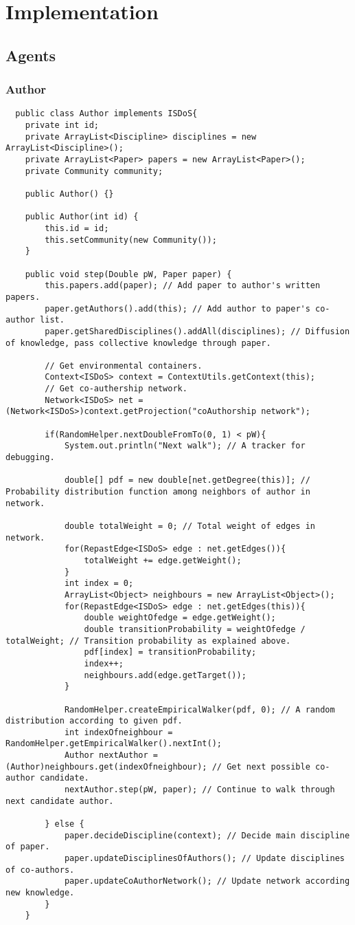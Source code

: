 \chapter{Implementation}
\section{Agents}

\subsection{Author}
\begin{lstlisting}
  public class Author implements ISDoS{
	private int id;
	private ArrayList<Discipline> disciplines = new ArrayList<Discipline>();
	private ArrayList<Paper> papers = new ArrayList<Paper>();
	private Community community;

	public Author() {}

	public Author(int id) {
		this.id = id;
		this.setCommunity(new Community());
	}

	public void step(Double pW, Paper paper) {
		this.papers.add(paper); // Add paper to author's written papers.
		paper.getAuthors().add(this); // Add author to paper's co-author list.
		paper.getSharedDisciplines().addAll(disciplines); // Diffusion of knowledge, pass collective knowledge through paper.
		
		// Get environmental containers.
		Context<ISDoS> context = ContextUtils.getContext(this);
		// Get co-authership network.
		Network<ISDoS> net = (Network<ISDoS>)context.getProjection("coAuthorship network");
		
		if(RandomHelper.nextDoubleFromTo(0, 1) < pW){
			System.out.println("Next walk"); // A tracker for debugging.
			
			double[] pdf = new double[net.getDegree(this)]; // Probability distribution function among neighbors of author in network.
			
			double totalWeight = 0; // Total weight of edges in network.
			for(RepastEdge<ISDoS> edge : net.getEdges()){
				totalWeight += edge.getWeight();
			}
			int index = 0;
			ArrayList<Object> neighbours = new ArrayList<Object>();
			for(RepastEdge<ISDoS> edge : net.getEdges(this)){
				double weightOfedge = edge.getWeight();
				double transitionProbability = weightOfedge / totalWeight; // Transition probability as explained above.
				pdf[index] = transitionProbability;
				index++;
				neighbours.add(edge.getTarget());
			}
			
			RandomHelper.createEmpiricalWalker(pdf, 0); // A random distribution according to given pdf.
			int indexOfneighbour = RandomHelper.getEmpiricalWalker().nextInt();
			Author nextAuthor = (Author)neighbours.get(indexOfneighbour); // Get next possible co-author candidate.
			nextAuthor.step(pW, paper); // Continue to walk through next candidate author.
			
		} else {
			paper.decideDiscipline(context); // Decide main discipline of paper.
			paper.updateDisciplinesOfAuthors(); // Update disciplines of co-authors.
			paper.updateCoAuthorNetwork(); // Update network according new knowledge.
		}
	}
\end{lstlisting}

